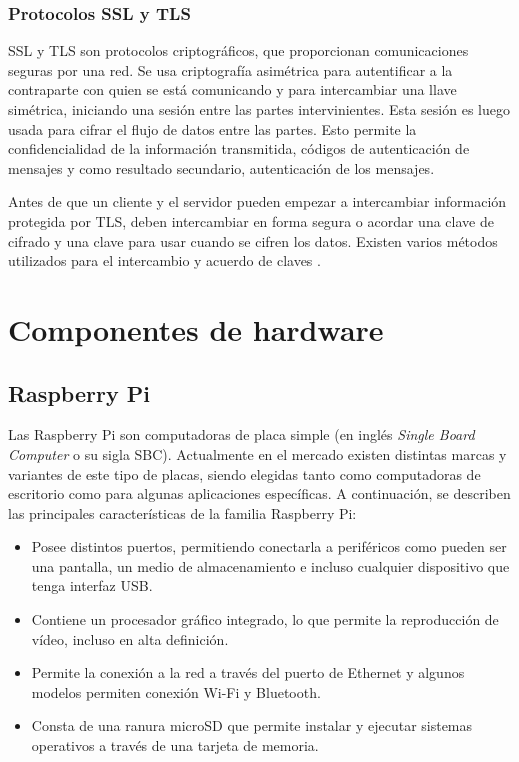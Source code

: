 \subsubsection{Protocolos SSL y TLS}

SSL y TLS son protocolos criptográficos, que proporcionan comunicaciones seguras por una red. Se usa criptografía asimétrica para autentificar a la contraparte con quien se está comunicando y para intercambiar una llave simétrica, iniciando una sesión entre las partes intervinientes. Esta sesión es luego usada para cifrar el flujo de datos entre las partes. Esto permite la confidencialidad de la información transmitida, códigos de autenticación de mensajes y como resultado secundario, autenticación de los mensajes. 

Antes de que un cliente y el servidor pueden empezar a intercambiar información protegida por TLS, deben intercambiar en forma segura o acordar una clave de cifrado y una clave para usar cuando se cifren los datos. Existen varios métodos utilizados para el intercambio y acuerdo de claves \citep{11}.

\section{Componentes de hardware}

\subsection{Raspberry Pi}

Las Raspberry Pi son computadoras de placa simple (en inglés \textit{Single Board Computer} o su sigla SBC). Actualmente en el mercado existen distintas marcas y variantes de este tipo de placas, siendo elegidas tanto como computadoras de escritorio como para algunas aplicaciones específicas. A continuación, se describen las principales características de la familia Raspberry Pi:

\begin{itemize}
	\item Posee distintos puertos, permitiendo conectarla a periféricos como pueden ser una pantalla, un medio de almacenamiento e incluso cualquier dispositivo que tenga interfaz USB.
	\item Contiene un procesador gráfico integrado, lo que permite la reproducción de vídeo, incluso en alta definición.
	\item Permite la conexión a la red a través del puerto de Ethernet y algunos modelos permiten conexión Wi-Fi y Bluetooth.
	\item Consta de una ranura microSD que permite instalar y ejecutar sistemas operativos a través de una tarjeta de memoria.
\end{itemize}

